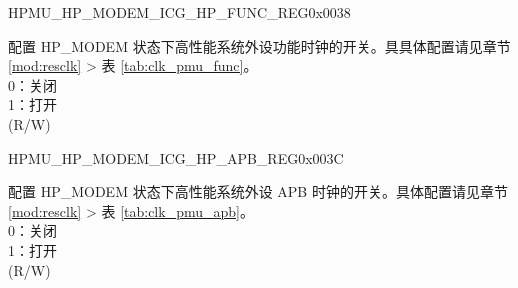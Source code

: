 \begin{register}{H}{PMU\_HP\_MODEM\_ICG\_HP\_FUNC\_REG}{0x0038}\label{regdesc:PMUHPMODEMICGHPFUNCREG}
%
\regnewline%
\begin{regdesc}\begin{reglist}
\label{fielddesc:PMUHPMODEMDIGICGFUNCEN}\item [PMU\_HP\_MODEM\_DIG\_ICG\_FUNC\_EN] 配置 HP\_MODEM 状态下高性能系统外设功能时钟的开关。具具体配置请见章节 \ref{mod:resclk} \textit{} > 表 \ref{tab:clk_pmu_func}。 \\
0：关闭\\
1：打开\\
(R/W)
\end{reglist}\end{regdesc}
\end{register}


\begin{register}{H}{PMU\_HP\_MODEM\_ICG\_HP\_APB\_REG}{0x003C}\label{regdesc:PMUHPMODEMICGHPAPBREG}
%
\regnewline%
\begin{regdesc}\begin{reglist}
\label{fielddesc:PMUHPMODEMDIGICGAPBEN}\item [PMU\_HP\_MODEM\_DIG\_ICG\_APB\_EN] 配置 HP\_MODEM 状态下高性能系统外设 APB 时钟的开关。具体配置请见章节 \ref{mod:resclk} \textit{} > 表 \ref{tab:clk_pmu_apb}。 \\
0：关闭\\
1：打开\\
(R/W)
\end{reglist}\end{regdesc}
\end{register}



